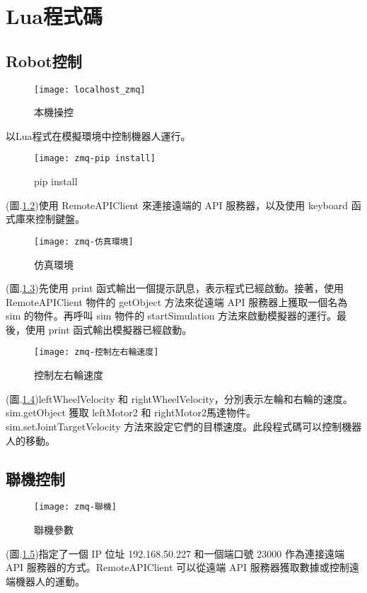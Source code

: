 \chapter{Lua程式碼}
\section{Robot控制}
\begin{figure}[hbt!]
\begin{center}
\texttt{[image: localhost\_zmq]}
\caption{\Large 本機操控}\label{localhost_zmq}
\end{center}
\end{figure}
以Lua程式在模擬環境中控制機器人運行。\\

\begin{figure}[hbt!]
\begin{center}
\texttt{[image: zmq-pip install]}
\caption{\Large pip install}\label{zmq-pip install}
\end{center}
\end{figure}
(圖.\ref{zmq-pip install})使用 RemoteAPIClient 來連接遠端的 API 服務器，以及使用 keyboard 函式庫來控制鍵盤。\\
\newpage

\begin{figure}[hbt!]
\begin{center}
\texttt{[image: zmq-仿真環境]}
\caption{\Large 仿真環境}\label{zmq-仿真環境}
\end{center}
\end{figure}
(圖.\ref{zmq-仿真環境})先使用 print 函式輸出一個提示訊息，表示程式已經啟動。接著，使用 RemoteAPIClient 物件的 getObject 方法來從遠端 API 服務器上獲取一個名為 sim 的物件。再呼叫 sim 物件的 startSimulation 方法來啟動模擬器的運行。最後，使用 print 函式輸出模擬器已經啟動。\\
\begin{figure}[hbt!]
\begin{center}
\texttt{[image: zmq-控制左右輪速度]}
\caption{\Large 控制左右輪速度}\label{zmq-控制左右輪速度}
\end{center}
\end{figure}

(圖.\ref{zmq-控制左右輪速度})leftWheelVelocity 和 rightWheelVelocity，分別表示左輪和右輪的速度。sim.getObject 獲取 leftMotor2 和 rightMotor2馬達物件。sim.setJointTargetVelocity 方法來設定它們的目標速度。此段程式碼可以控制機器人的移動。\\
\newpage
\section{聯機控制}
\begin{figure}[hbt!]
\begin{center}
\texttt{[image: zmq-聯機]}
\caption{\Large 聯機參數}\label{zmq-聯機}
\end{center}
\end{figure}
(圖.\ref{zmq-聯機})指定了一個 IP 位址 192.168.50.227 和一個端口號 23000 作為連接遠端 API 服務器的方式。RemoteAPIClient 可以從遠端 API 服務器獲取數據或控制遠端機器人的運動。\\
\newpage
